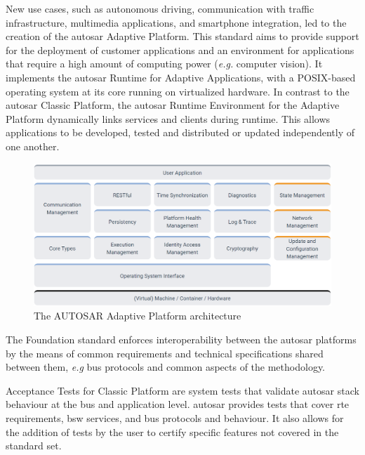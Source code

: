 New use cases, such as autonomous driving, communication with traffic infrastructure, multimedia applications, and smartphone integration, led to the creation of the \gls{autosar} Adaptive Platform. This standard aims to provide support for the deployment of customer applications and an environment for applications that require a high amount of computing power (\textit{e.g.} computer vision). It implements the \gls{autosar} Runtime for Adaptive Applications, with a POSIX-based operating system at its core running \citep{autosar_adaptive_os} on virtualized hardware. In contrast to the \gls{autosar} Classic Platform, the \gls{autosar} Runtime Environment for the Adaptive Platform dynamically links services and clients during runtime. This allows applications to be developed, tested and distributed or updated independently of one another.

\begin{figure}
    \centering
    \includegraphics[width = \linewidth]{img/parts/introduction/AUTOSAR Adaptive Platform.png}
    \caption{The AUTOSAR Adaptive Platform architecture \citep{autosar_adaptive_arch}}
    \label{fig:autosar_adaptive_arch}
\end{figure}

The Foundation standard enforces interoperability between the \gls{autosar} platforms by the means of common requirements and technical specifications shared between them, \textit{e.g} bus protocols and common aspects of the methodology.\par

Acceptance Tests for Classic Platform are system tests that validate \gls{autosar} stack behaviour at the bus and application level. \gls{autosar} provides tests that cover \gls{rte} requirements, \gls{bsw} services, and bus protocols and behaviour. It also allows for the addition of tests by the user to certify specific features not covered in the standard set.\par

